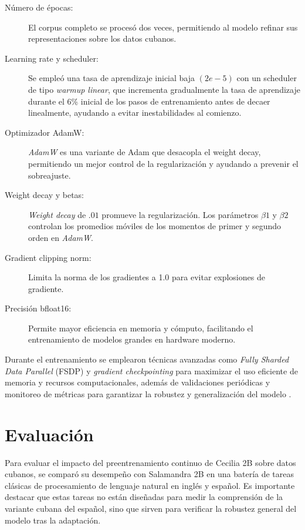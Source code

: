 \documentclass[10pt,twoside]{rcmart} %
\begin{document}
\begin{description}
\item[Número de épocas:] El corpus completo se procesó dos veces, permitiendo al modelo refinar sus representaciones sobre los datos cubanos.
\item[Learning rate y scheduler:] Se empleó una tasa de aprendizaje inicial baja $(2e-5)$ con un scheduler de tipo \textit{warmup linear}, que incrementa gradualmente la tasa de aprendizaje durante el 6\% inicial de los pasos de entrenamiento antes de decaer linealmente, ayudando a evitar inestabilidades al comienzo.
\item[Optimizador AdamW:] \textit{AdamW} es una variante de Adam que desacopla el weight decay, permitiendo un mejor control de la regularización y ayudando a prevenir el sobreajuste.
\item[Weight decay y betas:] \textit{Weight decay} de $.01$ promueve la regularización. Los parámetros $\beta 1$ y $\beta 2$ controlan los promedios móviles de los momentos de primer y segundo orden en \textit{AdamW}.
\item[Gradient clipping norm:] Limita la norma de los gradientes a 1.0 para evitar explosiones de gradiente.
\item[Precisión bfloat16:] Permite mayor eficiencia en memoria y cómputo, facilitando el entrenamiento de modelos grandes en hardware moderno.
\end{description}

Durante el entrenamiento se emplearon técnicas avanzadas como \textit{Fully Sharded Data Parallel} (FSDP) y \textit{gradient checkpointing} para maximizar el uso eficiente de memoria y recursos computacionales, además de validaciones periódicas y monitoreo de métricas para garantizar la robustez y generalización del modelo \cite{lialin2023scaling}.

\section{Evaluación}

Para evaluar el impacto del preentrenamiento continuo de Cecilia 2B sobre datos cubanos, se comparó su desempeño con Salamandra 2B en una batería de tareas clásicas de procesamiento de lenguaje natural en inglés y español. Es importante destacar que estas tareas no están diseñadas para medir la comprensión de la variante cubana del español, sino que sirven para verificar la robustez general del modelo tras la adaptación.
\end{document}
